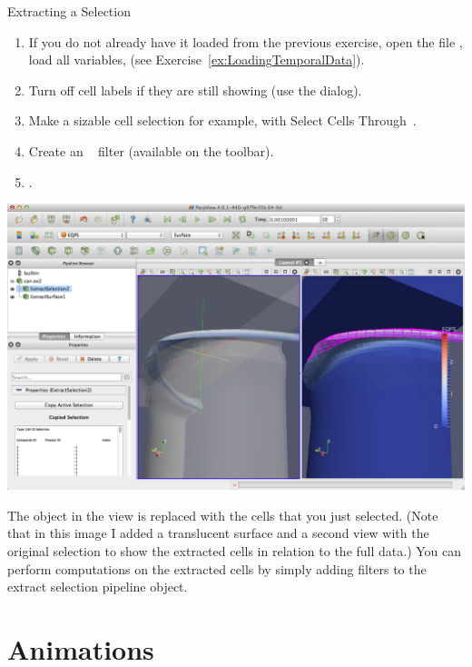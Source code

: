 \begin{exercise}{Extracting a Selection}
  \label{ex:ExtractingASelection}%
  \begin{enumerate}
  \item If you do not already have it loaded from the previous exercise,
    open the file , load all variables, \apply (see
    Exercise~\ref{ex:LoadingTemporalData}).
  \item Turn off cell labels if they are still showing (use the
     dialog).
  \item Make a sizable cell selection for example, with Select Cells
    Through~\selectCellsThrough.
  \item Create an ~\extractSelection
    filter (available on the toolbar).
  \item \apply.
  \end{enumerate}

  \begin{inlinefig}
    \includegraphics[width=\scw]{images/ExtractSelection}
  \end{inlinefig}

  The object in the view is replaced with the cells that you just
  selected. (Note that in this image I added a translucent surface and a
  second view with the original selection to show the extracted cells in
  relation to the full data.) You can perform computations on the extracted
  cells by simply adding filters to the extract selection pipeline object.
\end{exercise}


\section{Animations}
\label{sec:Animations}


